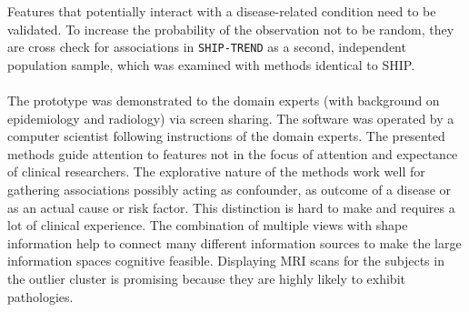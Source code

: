 \documentclass[journal]{style/vgtc} 			          %
\begin{document}
Features that potentially interact with a disease-related condition need to be validated.
%
To increase the probability of the observation not to be random, they are cross check for associations in \texttt{SHIP-TREND} as a second, independent population sample, which was examined with methods identical to SHIP.
%
\\\\
The prototype was demonstrated to the domain experts (with background on epidemiology and radiology) via screen sharing.
%
The software was operated by a computer scientist following instructions of the domain experts.
%
The presented methods guide attention to features not in the focus of attention and expectance of clinical researchers.
%
The explorative nature of the methods work well for gathering associations possibly acting as confounder, as outcome of a disease or as an actual cause or risk factor.
%
This distinction is hard to make and requires a lot of clinical experience.
%
The combination of multiple views with shape information help to connect many different information sources to make the large information spaces cognitive feasible.
%
Displaying MRI scans for the subjects in the outlier cluster is promising because they are highly likely to exhibit pathologies.
%

\end{document}
